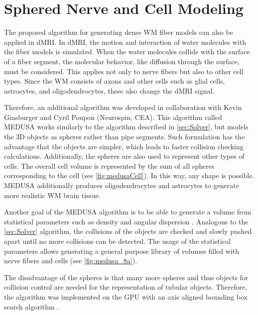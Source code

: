 \section{Sphered Nerve and Cell Modeling}
\label{sec:medusa}
%
The proposed algorithm for generating dense \ac{WM} fiber models can also be applied in \ac{dMRI}.
In \ac{dMRI}, the motion and interaction of water molecules with the fiber models is simulated.
When the water molecules collide with the surface of a fiber segment, the molecular behavior, like diffusion through the surface, must be considered.
This applies not only to nerve fibers but also to other cell types.
Since the WM consists of axons and other cells such as glial cells, astrocytes, and oligodendrocytes, these also change the \ac{dMRI} signal.
\par
%
Therefore, an additional algorithm was developed in collaboration with Kevin Ginsburger and Cyril Poupon (Neurospin, \ac{CEA}).
This algorithm called \ac{MEDUSA} \cite{Ginsburger2019} works similarly to the algorithm described in \cref{sec:Solver}, but models the 3D objects as spheres rather than pipe segments.
Such formulation has the advantage that the objects are simpler,
which leads to faster collision checking calculations.
Additionally, the spheres are also used to represent other types of cells.
The overall cell volume is represented by the sum of all spheres corresponding to the cell (see \cref{fig:medusaCell}).
In this way, any shape is possible.
\ac{MEDUSA} additionally produces oligodendrocytes and astrocytes to generate more realistic \ac{WM} brain tissue.
\par
%
Another goal of the \ac{MEDUSA} algorithm is to be able to generate a volume from statistical parameters such as density and angular dispersion \cite{Ginsburger2019, ginsburgerDis2019}.
Analogous to the \cref{sec:Solver} algorithm, the collisions of the objects are checked and slowly pushed apart until no more collisions can be detected.
The usage of the statistical parameters allows generating a general purpose library of volumes filled with nerve fibers and cells (see \cref{fig:medusa_8a}).
\par
%
The disadvantage of the spheres is that many more spheres and thus objects for collision control are needed for the representation of tubular objects.
Therefore, the algorithm was implemented on the \ac{GPU} with an axis aligned bounding box search algorithm \cite{Karras2012}.
%
%
%
